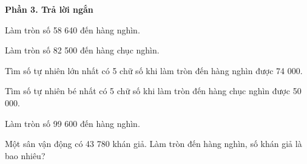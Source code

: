 \textbf{Phần 3. Trả lời ngắn}

\begin{ex} %
Làm tròn số 58 640 đến hàng nghìn.
\end{ex}

\begin{ex} %
Làm tròn số 82 500 đến hàng chục nghìn.
\end{ex}

\begin{ex} %
Tìm số tự nhiên lớn nhất có 5 chữ số khi làm tròn đến hàng nghìn được 74 000.
\end{ex}

\begin{ex} %
Tìm số tự nhiên bé nhất có 5 chữ số khi làm tròn đến hàng chục nghìn được 50 000.
\end{ex}

\begin{ex} %
Làm tròn số 99 600 đến hàng nghìn.
\end{ex}

\begin{ex} %
Một sân vận động có 43 780 khán giả. Làm tròn đến hàng nghìn, số khán giả là bao nhiêu?
\end{ex}
